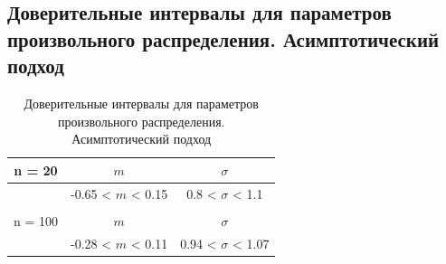 \subsection{Доверительные интервалы для параметров произвольного распределения. Асимптотический подход}
\begin{table}[H]
	\centering
	\begin{tabular}{| c | c | c |}
		\hline
		n = 20   &  $m$  & $\sigma$\\ \hline
		&  -0.65 < $m$ < 0.15 & 0.8 < $\sigma$ < 1.1 \\ \hline
		&   &   \\ \hline
		n = 100   &  $m$  & $\sigma$\\ \hline
		& -0.28 < $m$ < 0.11 & 0.94 < $\sigma$ < 1.07 \\
		\hline
	\end{tabular}
	\caption{Доверительные интервалы для параметров произвольного распределения. Асимптотический подход}
	\label{tab:interv_asimpt}
\end{table}